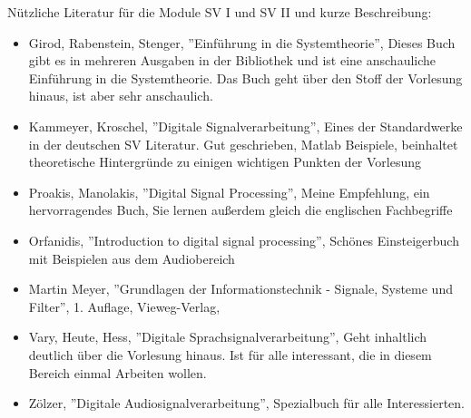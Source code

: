 \begin{titlepage}
Nützliche Literatur für die Module SV I und SV II und kurze Beschreibung:
\begin{itemize}
\item Girod, Rabenstein, Stenger, ''Einführung in die Systemtheorie'', Dieses Buch gibt es
in mehreren Ausgaben in der Bibliothek und ist eine anschauliche Einführung in die Systemtheorie.
Das Buch geht über den Stoff der Vorlesung hinaus, ist aber sehr anschaulich.
\item Kammeyer, Kroschel, ''Digitale Signalverarbeitung'', Eines der Standardwerke in der deutschen
SV Literatur. Gut geschrieben, Matlab Beispiele, beinhaltet theoretische Hintergründe zu einigen wichtigen Punkten der Vorlesung
\item Proakis, Manolakis, ''Digital Signal Processing'', Meine Empfehlung, ein hervorragendes Buch, Sie lernen außerdem gleich die englischen Fachbegriffe
\item Orfanidis, ''Introduction to digital signal processing'', Schönes Einsteigerbuch mit Beispielen aus dem Audiobereich
\item Martin Meyer, ''Grundlagen der Informationstechnik - Signale, Systeme und Filter'', 1. Auflage, Vieweg-Verlag,
\item Vary, Heute, Hess, ''Digitale Sprachsignalverarbeitung'', Geht inhaltlich deutlich über die Vorlesung hinaus. Ist für alle interessant, die in diesem Bereich einmal Arbeiten wollen.
\item Zölzer, ''Digitale Audiosignalverarbeitung'', Spezialbuch für alle Interessierten.
\end{itemize}


\vfill
\end{titlepage}
